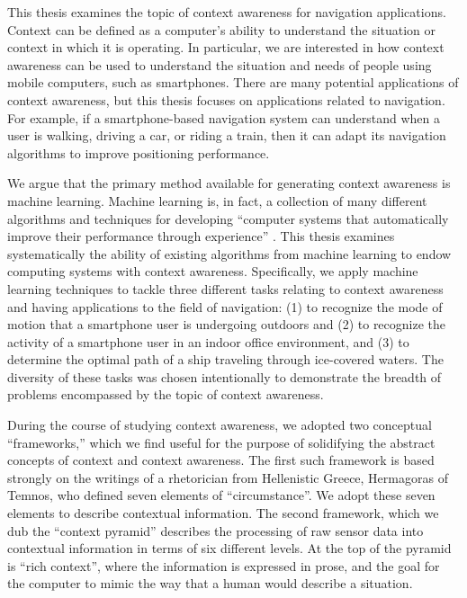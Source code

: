 This thesis examines the topic of context awareness for navigation applications. Context can be defined as a computer's ability to understand the situation or context in which it is operating. In particular, we are interested in how context awareness can be used to understand the situation and needs of people using mobile computers, such as smartphones. There are many potential applications of context awareness, but this thesis focuses on applications related to navigation. For example, if a smartphone-based navigation system can understand when a user is walking, driving a car, or riding a train, then it can adapt its navigation algorithms to improve positioning performance.

We argue that the primary method available for generating context awareness is machine learning. Machine learning is, in fact, a collection of many different algorithms and techniques for developing ``computer systems that automatically improve their performance through experience'' \cite{Mitchell1990}. This thesis examines systematically the ability of existing algorithms from machine learning to endow computing systems with context awareness. Specifically, we apply machine learning techniques to tackle three different tasks relating to context awareness and having applications to the field of navigation:  (1) to recognize the mode of motion that a smartphone user is undergoing outdoors and (2) to recognize the activity of a smartphone user in
an indoor office environment, and (3) to determine the optimal path of a ship traveling through ice-covered waters. The diversity of these tasks was chosen intentionally to demonstrate the breadth of problems encompassed by the topic of context awareness.

During the course of studying context awareness, we adopted two conceptual ``frameworks,'' which we find useful for the purpose of solidifying the abstract concepts of context and context awareness. The first such framework is based strongly on the writings of a rhetorician from Hellenistic Greece, Hermagoras of Temnos, who defined seven elements of ``circumstance''. We adopt these seven elements to describe contextual information. The second framework, which we dub the ``context pyramid'' describes the processing of raw sensor data into contextual information in terms of six different levels. At the top of the pyramid is ``rich context'', where the information is expressed in prose, and the goal for the computer to mimic the way that a human would describe a situation.

